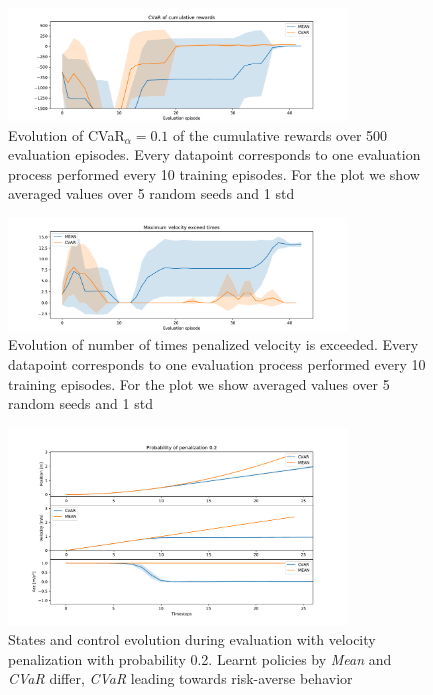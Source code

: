 \begin{figure}[ht]
        \centering
        \includegraphics[width=0.8\textwidth]{images/Car/CVAR/cvar_train_withstds.pdf}
        \caption{Evolution of CVaR$_\alpha=0.1$ of the cumulative rewards over 500 evaluation episodes.
        Every datapoint corresponds
        to one evaluation process performed every 10 training episodes.
        For the plot we
        show averaged values over 5 random seeds and 1 std}
        \label{fig:cvar_car}
    
\end{figure}

\begin{figure}[ht]
        \centering
        \includegraphics[width=0.8\textwidth]{images/Car/CVAR/times_exceedvel_withstds.pdf}
        \caption{Evolution of number of times penalized velocity is exceeded.
        Every datapoint corresponds
        to one evaluation process performed every 10 training episodes. For the plot we
        show averaged values over 5 random seeds and 1 std}
        \label{fig:maxveltimes_car}
    
\end{figure}

\begin{figure}[ht]
        \centering
        \includegraphics[width=0.8\textwidth]{images/Car/CVAR/Trajectory_withstds_penal.pdf}
        \caption{States and control evolution during evaluation with velocity penalization
        with probability 0.2.
        Learnt policies by \textit{Mean} and \textit{CVaR} differ, \textit{CVaR} leading
        towards risk-averse behavior}
        \label{fig:traj_probpenal0.2}
    
\end{figure}


